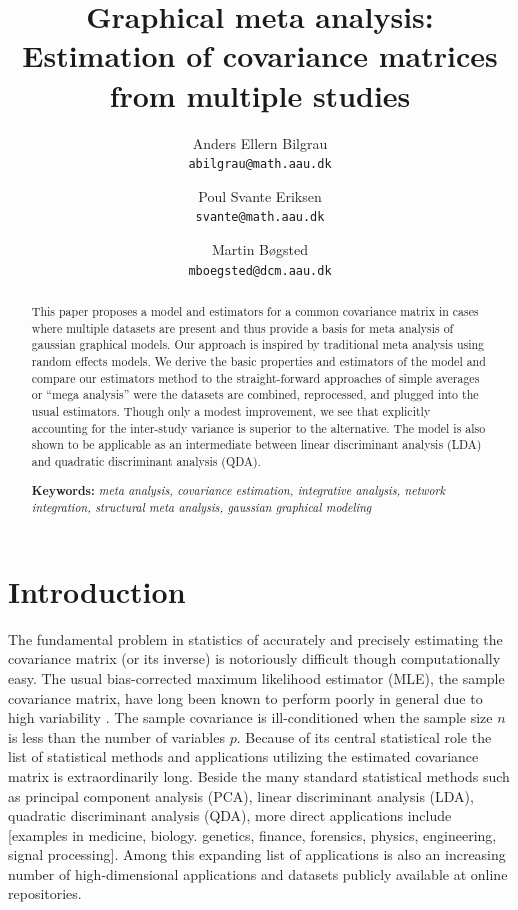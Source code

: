 \documentclass{article}\usepackage[]{graphicx}\usepackage[]{color}
\title{Graphical meta analysis: Estimation of covariance matrices from multiple studies}
\author{
  Anders Ellern Bilgrau \\ \texttt{abilgrau@math.aau.dk} \and
  Poul Svante Eriksen \\ \texttt{svante@math.aau.dk} \and
  Martin B\o{}gsted \\ \texttt{m\textunderscore{}boegsted@dcm.aau.dk}
}
\begin{document}
\maketitle
\begin{abstract}
This paper proposes a model and estimators for a common covariance matrix in cases where multiple datasets are present and thus provide a basis for meta analysis of gaussian graphical models. Our approach is inspired by traditional meta analysis using random effects models. We derive the basic properties and estimators of the model and compare our estimators method to the straight-forward approaches of simple averages or ``mega analysis'' were the datasets are combined, reprocessed, and plugged into the usual estimators. Though only a modest improvement, we see that explicitly accounting for the inter-study variance is superior to the alternative.  The model is also shown to be applicable as an intermediate between linear discriminant analysis (LDA) and quadratic discriminant analysis (QDA). \medskip

\noindent \textbf{Keywords:} \textit{meta analysis, covariance estimation, integrative analysis, network integration, structural meta analysis, gaussian graphical modeling}
\end{abstract}

\newpage
\tableofcontents


\newpage
\section{Introduction}
The fundamental problem in statistics of accurately and precisely estimating the covariance matrix (or its inverse) is notoriously difficult though computationally easy. The usual bias-corrected maximum likelihood estimator (MLE), the sample covariance matrix, have long been known to perform poorly in general due to high variability \citep{Dempster1972}. The sample covariance is ill-conditioned when the sample size $n$ is less than the number of variables $p$. Because of its central statistical role the list of statistical methods and applications utilizing the estimated covariance matrix is extraordinarily long. Beside the many standard statistical methods such as principal component analysis (PCA), linear discriminant analysis (LDA), quadratic discriminant analysis (QDA), more direct applications include [examples in medicine, biology. genetics, finance, forensics, physics, engineering, signal processing]. Among this expanding list of applications is also an increasing number of high-dimensional applications and datasets publicly available at online repositories.
\end{document}
